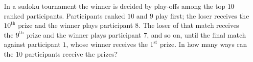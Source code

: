 In a sudoku tournament the winner is decided by play-offs among the top $10$ ranked participants. Participants ranked $10$ and $9$ play first; the loser receives the $10^{\text{th}}$ prize and the winner plays participant $8$. The loser of that match receives the $9^{\text{th}}$ prize and the winner plays participant $7$, and so on, until the final match against participant $1$, whose winner receives the $1^{\text{st}}$ prize. In how many ways can the $10$ participants receive the prizes?
